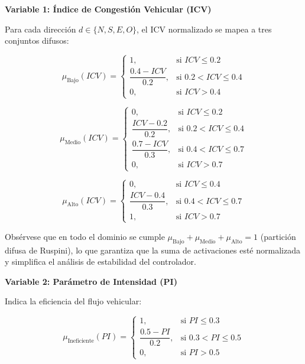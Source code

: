 \documentclass[12pt,a4paper,oneside]{report}
\begin{document}
\textbf{Variable 1: Índice de Congestión Vehicular (ICV)}

Para cada dirección \(d \in \{N, S, E, O\}\), el ICV normalizado se mapea a tres conjuntos difusos:

\begin{equation}
\mu_{\text{Bajo}}(ICV) =
\begin{cases}
1, & \text{si } ICV \leq 0.2\\[3pt]
\dfrac{0.4 - ICV}{0.2}, & \text{si } 0.2 < ICV \leq 0.4\\[6pt]
0, & \text{si } ICV > 0.4
\end{cases}
\label{eq:mu-icv-bajo}
\end{equation}

\begin{equation}
\mu_{\text{Medio}}(ICV) =
\begin{cases}
0, & \text{si } ICV \leq 0.2\\[3pt]
\dfrac{ICV - 0.2}{0.2}, & \text{si } 0.2 < ICV \leq 0.4\\[6pt]
\dfrac{0.7 - ICV}{0.3}, & \text{si } 0.4 < ICV \leq 0.7\\[6pt]
0, & \text{si } ICV > 0.7
\end{cases}
\label{eq:mu-icv-medio}
\end{equation}

\begin{equation}
\mu_{\text{Alto}}(ICV) =
\begin{cases}
0, & \text{si } ICV \leq 0.4\\[3pt]
\dfrac{ICV - 0.4}{0.3}, & \text{si } 0.4 < ICV \leq 0.7\\[6pt]
1, & \text{si } ICV > 0.7
\end{cases}
\label{eq:mu-icv-alto}
\end{equation}

Obsérvese que en todo el dominio se cumple \(\mu_{\text{Bajo}} + \mu_{\text{Medio}} + \mu_{\text{Alto}} = 1\) (partición difusa de Ruspini), lo que garantiza que la suma de activaciones esté normalizada y simplifica el análisis de estabilidad del controlador.

\textbf{Variable 2: Parámetro de Intensidad (PI)}

Indica la eficiencia del flujo vehicular:

\begin{equation}
\mu_{\text{Ineficiente}}(PI) =
\begin{cases}
1, & \text{si } PI \leq 0.3\\[3pt]
\dfrac{0.5 - PI}{0.2}, & \text{si } 0.3 < PI \leq 0.5\\[6pt]
0, & \text{si } PI > 0.5
\end{cases}
\label{eq:mu-pi-inef}
\end{equation}
\end{document}
